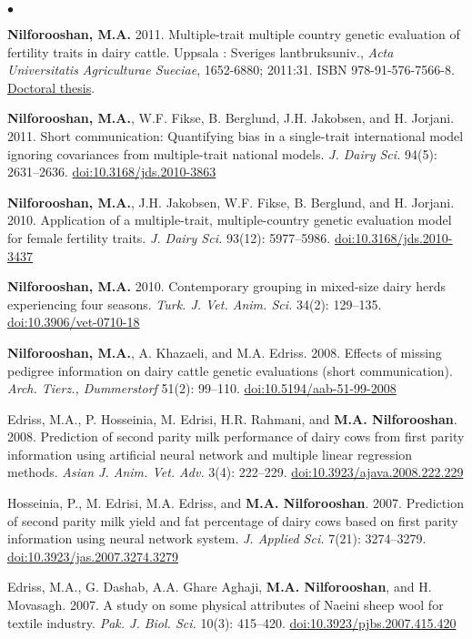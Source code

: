 \documentclass[margin,line]{res}
\newenvironment{list2}{
  \begin{list}{$\bullet$}{%
      \setlength{\itemsep}{0in}
      \setlength{\parsep}{0in} \setlength{\parskip}{0in}
      \setlength{\topsep}{0in} \setlength{\partopsep}{0in}
      \setlength{\leftmargin}{0.2in}}}{\end{list}}
\begin{document}
\begin{resume}
\begin{list2}
\item {\bf Nilforooshan, M.A.} 2011. Multiple-trait multiple country genetic evaluation of fertility traits in dairy cattle. Uppsala : Sveriges lantbruksuniv., {\em Acta Universitatis Agriculturae Sueciae}, 1652-6880; 2011:31. ISBN 978-91-576-7566-8. \href{https://pub.epsilon.slu.se/8094}{Doctoral thesis}.
\item {\bf Nilforooshan, M.A.}, W.F. Fikse, B. Berglund, J.H. Jakobsen, and H. Jorjani. 2011. Short communication: Quantifying bias in a single-trait international model ignoring covariances from multiple-trait national models. {\em J. Dairy Sci.} 94(5): 2631--2636. \href{https://doi.org/10.3168/jds.2010-3863}{doi:10.3168/jds.2010-3863}
\item {\bf Nilforooshan, M.A.}, J.H. Jakobsen, W.F. Fikse, B. Berglund, and H. Jorjani. 2010. Application of a multiple-trait, multiple-country genetic evaluation model for female fertility traits. {\em J. Dairy Sci.} 93(12): 5977--5986. \href{https://doi.org/10.3168/jds.2010-3437}{doi:10.3168/jds.2010-3437}
\item {\bf Nilforooshan, M.A.} 2010. Contemporary grouping in mixed-size dairy herds experiencing four seasons. {\em Turk. J. Vet. Anim. Sci.} 34(2): 129--135. \href{https://doi.org/10.3906/vet-0710-18}{doi:10.3906/vet-0710-18}
\item {\bf Nilforooshan, M.A.}, A. Khazaeli, and M.A. Edriss. 2008. Effects of missing pedigree information on dairy cattle genetic evaluations (short communication). {\em Arch. Tierz., Dummerstorf} 51(2): 99--110. \href{https://doi.org/10.5194/aab-51-99-2008}{doi:10.5194/aab-51-99-2008}
\item Edriss, M.A., P. Hosseinia, M. Edrisi, H.R. Rahmani, and {\bf M.A. Nilforooshan}. 2008. Prediction of second parity milk performance of dairy cows from first parity information using artificial neural network and multiple linear regression methods. {\em Asian J. Anim. Vet. Adv.} 3(4): 222--229. \href{https://doi.org/10.3923/ajava.2008.222.229}{doi:10.3923/ajava.2008.222.229}
\item Hosseinia, P., M. Edrisi, M.A. Edriss, and {\bf M.A. Nilforooshan}. 2007. Prediction of second parity milk yield and fat percentage of dairy cows based on first parity information using neural network system. {\em J. Applied Sci.} 7(21): 3274--3279. \href{https://doi.org/10.3923/jas.2007.3274.3279}{doi:10.3923/jas.2007.3274.3279}
\item Edriss, M.A., G. Dashab, A.A. Ghare Aghaji, {\bf M.A. Nilforooshan}, and H. Movasagh. 2007. A study on some physical attributes of Naeini sheep wool for textile industry. {\em Pak. J. Biol. Sci.} 10(3): 415--420. \href{https://doi.org/10.3923/pjbs.2007.415.420}{doi:10.3923/pjbs.2007.415.420}

\end{list2}
\end{resume}
\end{document}
